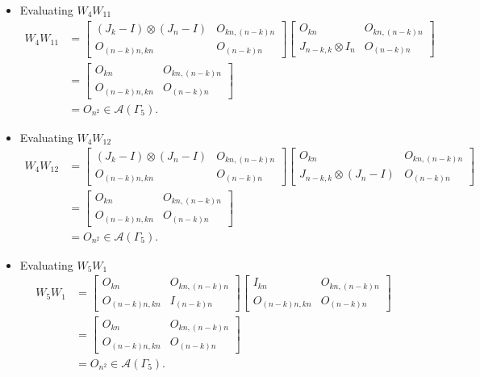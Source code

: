 \begin{itemize}
\item Evaluating $W_{4}W_{11}$
\begin{align*}
    W_4W_{11} &=
    \begin{bmatrix}
        (J_k - I) \otimes (J_n - I) & O_{kn, (n-k)n} \\
        O_{(n-k)n,kn} & O_{(n-k)n}
    \end{bmatrix}
    \begin{bmatrix}
    O_{kn} & O_{kn, (n-k)n} \\
    J_{n-k, k}\otimes I_n & O_{(n-k)n}
    \end{bmatrix}\\
    &= \begin{bmatrix}
        O_{kn} & O_{kn, (n-k)n} \\
        O_{(n-k)n,kn} & O_{(n - k)n} 
    \end{bmatrix}\\
    &= O_{n^2}\in\mathcal{A}(\Gamma_5).
\end{align*}

\item Evaluating $W_{4}W_{12}$
\begin{align*}
    W_4W_{12} &=
    \begin{bmatrix}
        (J_k - I) \otimes (J_n - I) & O_{kn, (n-k)n} \\
        O_{(n-k)n,kn} & O_{(n-k)n}
    \end{bmatrix}
    \begin{bmatrix}
    O_{kn} & O_{kn, (n-k)n} \\
    J_{n-k, k}\otimes (J_n-I) & O_{(n-k)n}
    \end{bmatrix}\\
    &= \begin{bmatrix}
        O_{kn} & O_{kn, (n-k)n} \\
        O_{(n-k)n,kn} & O_{(n - k)n} 
    \end{bmatrix}\\
    &= O_{n^2}\in\mathcal{A}(\Gamma_5).
\end{align*}

\item Evaluating $W_{5}W_{1}$
\begin{align*}
    W_5W_1
    &= \begin{bmatrix}
        O_{kn} & O_{kn, (n-k)n} \\
        O_{(n-k)n,kn} & I_{(n - k)n}
    \end{bmatrix}
    \begin{bmatrix}
        I_{kn} & O_{kn, (n-k)n} \\
        O_{(n-k)n,kn} & O_{(n - k)n}
    \end{bmatrix}\\
    &= \begin{bmatrix}
        O_{kn} & O_{kn, (n-k)n} \\
        O_{(n-k)n,kn} & O_{(n - k)n} 
    \end{bmatrix}\\
    &= O_{n^2}\in\mathcal{A}(\Gamma_5).
\end{align*}


\end{itemize}

